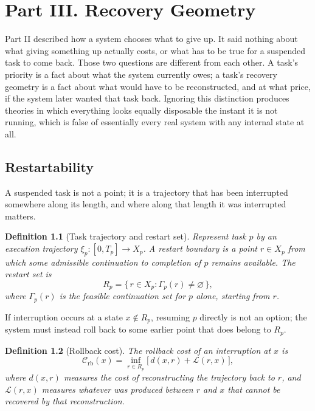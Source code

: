 \documentclass[11pt]{report}
\newtheorem{definition}{Definition}[chapter]
\begin{document}
\part*{Part III. Recovery Geometry}

Part II described how a system chooses what to give up. It said nothing about what giving something up actually costs, or what has to be true for a suspended task to come back. Those two questions are different from each other. A task's priority is a fact about what the system currently owes; a task's recovery geometry is a fact about what would have to be reconstructed, and at what price, if the system later wanted that task back. Ignoring this distinction produces theories in which everything looks equally disposable the instant it is not running, which is false of essentially every real system with any internal state at all.

\chapter{Restartability}

A suspended task is not a point; it is a trajectory that has been interrupted somewhere along its length, and where along that length it was interrupted matters.

\begin{definition}[Task trajectory and restart set]
Represent task $p$ by an execution trajectory $\xi_p : [0, T_p] \to X_p$. A restart boundary is a point $r \in X_p$ from which some admissible continuation to completion of $p$ remains available. The restart set is
\[
R_p = \{\, r \in X_p : \Gamma_p(r) \ne \varnothing \,\},
\]
where $\Gamma_p(r)$ is the feasible continuation set for $p$ alone, starting from $r$.
\end{definition}

If interruption occurs at a state $x \notin R_p$, resuming $p$ directly is not an option; the system must instead roll back to some earlier point that does belong to $R_p$.

\begin{definition}[Rollback cost]
The rollback cost of an interruption at $x$ is
\[
\mathcal C_{\mathrm{rb}}(x) = \inf_{r \in R_p} \bigl[\, d(x, r) + \mathcal L(r, x) \,\bigr],
\]
where $d(x, r)$ measures the cost of reconstructing the trajectory back to $r$, and $\mathcal L(r, x)$ measures whatever was produced between $r$ and $x$ that cannot be recovered by that reconstruction.
\end{definition}
\end{document}
